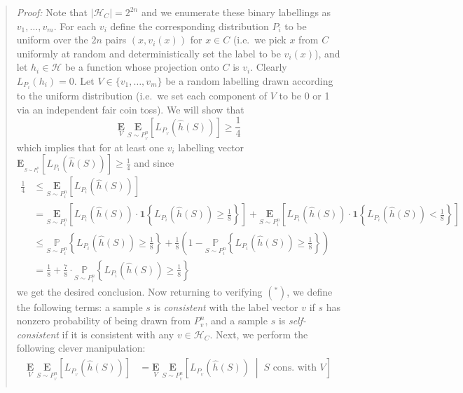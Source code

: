 \documentclass[]{article}
\begin{document}
\begin{quote}
\emph{Proof:} Note that \(|\mathcal{H}_C| = 2^{2n}\) and we enumerate
these binary labellings as \(v_1, \ldots, v_m\). For each \(v_i\) define
the corresponding distribution \(P_i\) to be uniform over the \(2n\)
pairs \((x, v_i(x))\) for \(x\in C\) (i.e.~we pick \(x\) from \(C\)
uniformly at random and deterministically set the label to be
\(v_i(x)\)), and let \(h_i \in \mathcal{H}\) be a function whose
projection onto \(C\) is \(v_i\). Clearly \(L_{P_i}(h_i) = 0\). Let
\(V\in \{v_1, \ldots, v_m\}\) be a random labelling drawn according to
the uniform distribution (i.e.~we set each component of \(V\) to be 0 or
1 via an independent fair coin toss). We will show that \[
\underset{V}{\mathbf{E}}\;\underset{S\sim P_{_V}^n}{\mathbf{E}}\left[ L_{P_{_V}}(\hat{h}(S))\right] \ge \frac{1}{4} \tag{*}
\] which implies that for at least one \(v_i\) labelling vector
\(\mathbf{E}_{_{S\sim P_{i}^n}}\left[ L_{P_{i}}(\hat{h}(S))\right] \ge \frac{1}{4}\)
and since \[
\begin{align*}
\frac{1}{4} &\le \underset{S\sim P_{i}^n}{\mathbf{E}}\left[ L_{P_{i}}(\hat{h}(S))\right] \\[5px]
&= \underset{S\sim P_{i}^n}{\mathbf{E}}\left[ L_{P_{i}}(\hat{h}(S)) \cdot \mathbf{1}\left\{L_{P_{i}}(\hat{h}(S)) \ge \frac{1}{8}\right\}\right] + \underset{S\sim P_{i}^n}{\mathbf{E}}\left[ L_{P_{i}}(\hat{h}(S)) \cdot \mathbf{1}\left\{L_{P_{i}}(\hat{h}(S)) < \frac{1}{8}\right\}\right] \\[5px]
&\le \underset{S\sim P_{i}^n}{\mathbb{P}}\left\{L_{P_{i}}(\hat{h}(S)) \ge \frac{1}{8}\right\} + \frac{1}{8} \left(1 - \underset{S\sim P_{i}^n}{\mathbb{P}}\left\{L_{P_{i}}(\hat{h}(S)) \ge \frac{1}{8}\right\} \right) \\[5px]
&= \frac{1}{8} + \frac{7}{8}\cdot\underset{S\sim P_{i}^n}{\mathbb{P}}\left\{L_{P_{i}}(\hat{h}(S)) \ge \frac{1}{8}\right\}
\end{align*}
\] we get the desired conclusion. Now returning to verifying \((^*)\),
we define the following terms: a sample \(s\) is \emph{consistent} with
the label vector \(v\) if \(s\) has nonzero probability of being drawn
from \(P_v^n\), and a sample \(s\) is \emph{self-consistent} if it is
consistent with any \(v\in \mathcal{H}_C\). Next, we perform the
following clever manipulation: \[
\begin{align*}
\underset{V}{\mathbf{E}}\;\underset{S\sim P_{_V}^n}{\mathbf{E}}\left[ L_{P_{_V}}(\hat{h}(S))\right] &= \underset{V}{\mathbf{E}}\;\underset{S\sim P_{_V}^n}{\mathbf{E}}\left[ L_{P_{_V}}(\hat{h}(S)) \; \middle| \; S \text{ cons. with } V \right] \\[5px]

\end{align*}\]
\end{quote}
\end{document}
